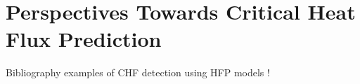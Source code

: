 
\chapter{Perspectives Towards Critical Heat Flux Prediction} %

\label{ch:to_CHF} %


Bibliography examples of CHF detection using HFP models !